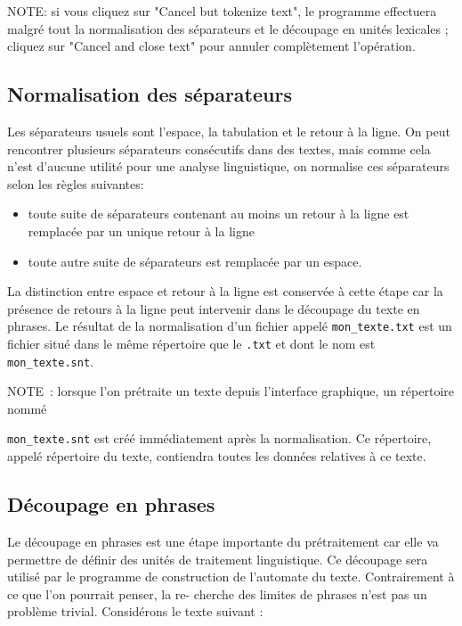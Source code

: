 \bigskip
\noindent NOTE: si vous cliquez sur "Cancel but tokenize text", le programme effectuera malgré
tout la normalisation des séparateurs et le découpage en unités lexicales ; cliquez sur "Cancel
and close text" pour annuler complètement l’opération.


\subsection{Normalisation des séparateurs}
Les séparateurs usuels sont l’espace, la tabulation et le retour à la ligne. On peut rencontrer
plusieurs séparateurs consécutifs dans des textes, mais comme cela n’est d’aucune utilité
pour une analyse linguistique, on normalise ces séparateurs selon les règles suivantes:

\begin{itemize}
  \item toute suite de séparateurs contenant au moins un retour à la ligne est remplacée par
  un unique retour à la ligne
  \item toute autre suite de séparateurs est remplacée par un espace.
\end{itemize}

\bigskip
\noindent 
La distinction entre espace et retour à la ligne est conservée à cette étape car la présence
de retours à la ligne peut intervenir dans le découpage du texte en phrases. Le résultat de
la normalisation d’un fichier appelé \verb+mon_texte.txt+ est un fichier situé dans le même
répertoire que le \verb+.txt+ et dont le nom est \verb+mon_texte.snt+. 

\bigskip
\noindent NOTE~: lorsque l’on prétraite un texte depuis l’interface graphique, un répertoire nommé

\noindent \verb+mon_texte.snt+ est créé immédiatement après la normalisation. Ce répertoire, appelé
répertoire du texte, 
 contiendra toutes les données relatives à ce texte.



\subsection{Découpage en phrases}
\label{section-sentence-splitting}
Le découpage en phrases est une étape importante du prétraitement car elle va permettre
de définir des unités de traitement linguistique. Ce découpage sera utilisé par le programme
de construction de l’automate du texte. Contrairement à ce que l’on pourrait penser, la re-
cherche des limites de phrases n’est pas un problème trivial. Considérons le texte suivant :


